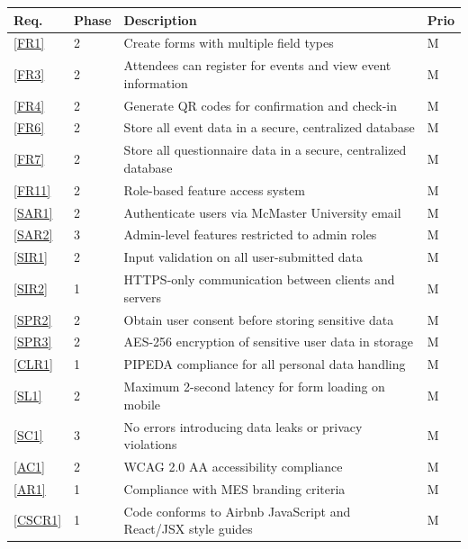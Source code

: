 \documentclass[12pt]{article}
\begin{document}
{
\setlength{\tabcolsep}{0.3em}
\renewcommand{\arraystretch}{1.3}
\begin{longtable}[H]{p{0.1\linewidth}p{0.08\linewidth}p{0.75\linewidth}p{0.07\linewidth}}
  \toprule
  \textbf{Req.} & \textbf{Phase} & \textbf{Description} & \textbf{Prio} \\
  \midrule
  \ref{FR1}   & 2 & Create forms with multiple field types                        & M \\
  \ref{FR3}   & 2 & Attendees can register for events and view event information  & M \\
  \ref{FR4}   & 2 & Generate QR codes for confirmation and check-in               & M \\
  \ref{FR6}   & 2 & Store all event data in a secure, centralized database        & M \\
  \ref{FR7}   & 2 & Store all questionnaire data in a secure, centralized database & M \\
  \ref{FR11}  & 2 & Role-based feature access system                              & M \\
  \ref{SAR1}  & 2 & Authenticate users via McMaster University email              & M \\
  \ref{SAR2}  & 3 & Admin-level features restricted to admin roles                & M \\
  \ref{SIR1}  & 2 & Input validation on all user-submitted data                   & M \\
  \ref{SIR2}  & 1 & HTTPS-only communication between clients and servers          & M \\
  \ref{SPR2}  & 2 & Obtain user consent before storing sensitive data             & M \\
  \ref{SPR3}  & 2 & AES-256 encryption of sensitive user data in storage          & M \\
  \ref{CLR1}  & 1 & PIPEDA compliance for all personal data handling              & M \\
  \ref{SL1}   & 2 & Maximum 2-second latency for form loading on mobile           & M \\
  \ref{SC1}   & 3 & No errors introducing data leaks or privacy violations        & M \\
  \ref{AC1}   & 2 & WCAG 2.0 AA accessibility compliance                          & M \\
  \ref{AR1}   & 1 & Compliance with MES branding criteria                         & M \\
  \ref{CSCR1} & 1 & Code conforms to Airbnb JavaScript and React/JSX style guides & M \\

\end{longtable}}
\end{document}
